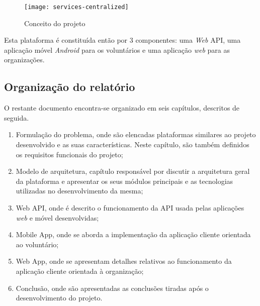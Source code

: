 \bigskip \bigskip \bigskip

\begin{figure}[h]
	\centering
	\texttt{[image: services-centralized]}
	\caption{Conceito do projeto}
\end{figure}

Esta plataforma é constituída então por 3 componentes: uma \textit{Web} API, uma aplicação móvel \textit{Android} para os voluntários e uma aplicação \textit{web} para as organizações.

\subsection{Organização do relatório}

O restante documento encontra-se organizado em seis capítulos, descritos de seguida.
\begin{enumerate}
	\item Formulação do problema, onde são elencadas plataformas similares ao projeto desenvolvido e as suas características. Neste capítulo, são também definidos os requisitos funcionais do projeto;
	\item Modelo de arquitetura, capítulo responsável por discutir a arquitetura geral da plataforma e apresentar os seus módulos principais e as tecnologias utilizadas no desenvolvimento da mesma;
	\item Web API, onde é descrito o funcionamento da API usada pelas aplicações \textit{web} e móvel desenvolvidas;
	\item Mobile App, onde se aborda a implementação da aplicação cliente orientada ao voluntário;
	\item Web App, onde se apresentam detalhes relativos ao funcionamento da aplicação cliente orientada à organização;
	\item Conclusão, onde são apresentadas as conclusões tiradas após o desenvolvimento do projeto.
\end{enumerate}
























